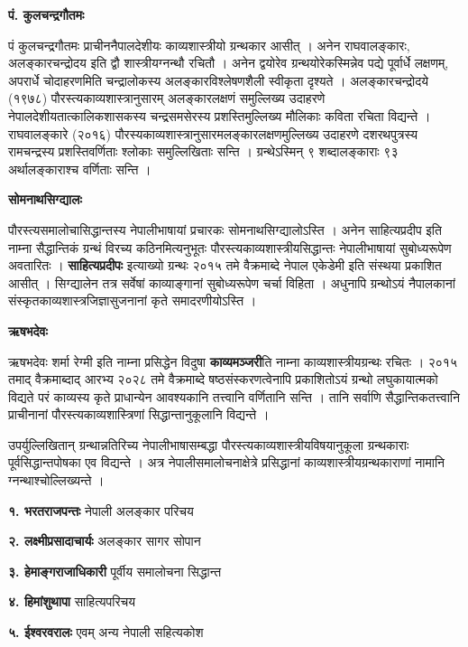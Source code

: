 \documentclass[10pt, a5paper, twoside]{article}
\newcommand{\customparagraph}[1]{
    \noindent \textbf{#1} \par
    \penalty 10000 %
    \vspace{0.1cm plus 0.05cm minus 0.02cm}
    \penalty 10000 %
}
\begin{document}
\customparagraph{\textbf{पं. कुलचन्द्रगौतमः}}

पं कुलचन्द्रगौतमः प्राचीननैपालदेशीयः काव्यशास्त्रीयो ग्रन्थकार आसीत् । अनेन राघवालङ्कारः, अलङ्कारचन्द्रोदय इति द्वौ शास्त्रीयग्नन्थौ रचितौ । अनेन द्वयोरेव ग्रन्थयोरेकस्मिन्नेव पद्ये पूर्वार्धे लक्षणम्, अपरार्धे चोदाहरणमिति चन्द्रालोकस्य अलङ्कारविश्लेषणशैली स्वीकृता दृश्यते । अलङ्कारचन्द्रोदये (१९७८) पौरस्त्यकाव्यशास्त्रानुसारम् अलङ्कारलक्षणं समुल्लिख्य उदाहरणे नेपालदेशीयतात्कालिकशासकस्य चन्द्रसमसेरस्य प्रशस्तिमुल्लिख्य मौलिकाः कविता रचिता विद्यन्ते । राघवालङ्कारे (२०१६) पौरस्यकाव्यशास्त्रानुसारमलङ्कारलक्षणमुल्लिख्य उदाहरणे दशरथपुत्रस्य रामचन्द्रस्य प्रशस्तिवर्णिताः श्लोकाः समुल्लिखिताः सन्ति । ग्रन्थेऽस्मिन् ९ शब्दालङ्काराः ९३ अर्थालङ्काराश्च वर्णिताः सन्ति ।

\customparagraph{\textbf{सोमनाथसिग्द्यालः}}

पौरस्त्यसमालोचासिद्धान्तस्य नेपालीभाषायां प्रचारकः सोमनाथसिग्द्यालोऽस्ति । अनेन साहित्यप्रदीप इति नाम्ना सैद्धान्तिकं ग्रन्थं विरच्य कठिनमित्यनुभूतः पौरस्त्यकाव्यशास्त्रीयसिद्धान्तः नेपालीभाषायां सुबोध्यरूपेण अवतारितः । \textbf{साहित्यप्रदीपः} इत्याख्यो ग्रन्थः २०१५ तमे वैक्रमाब्दे नेपाल एकेडेमी इति संस्थया प्रकाशित आसीत् । सिग्द्यालेन तत्र सर्वेषां काव्याङ्गानां सुबोध्यरूपेण चर्चा विहिता । अधुनापि ग्रन्थोऽयं नैपालकानां संस्कृतकाव्यशास्त्रजिज्ञासुजनानां कृते समादरणीयोऽस्ति ।

\customparagraph{\textbf{ऋषभदेवः}}

ऋषभदेवः शर्मा रेग्मी इति नाम्ना प्रसिद्धेन विदुषा \textbf{काव्यमञ्जरी}ति नाम्ना काव्यशास्त्रीयग्रन्थः रचितः । २०१५ तमाद् वैक्रमाब्दाद् आरभ्य २०२८ तमे वैक्रमाब्दे षष्ठसंस्करणत्वेनापि प्रकाशितोऽयं ग्रन्थो लघुकायात्मको विद्यते परं काव्यस्य कृते प्राधान्येन आवश्यकानि तत्त्वानि वर्णितानि सन्ति । तानि सर्वाणि सैद्धान्तिकतत्त्वानि प्राचीनानां पौरस्त्यकाव्यशास्त्रिणां सिद्धान्तानुकूलानि विद्यन्ते ।

उपर्युल्लिखितान् ग्रन्थान्नतिरिच्य नेपालीभाषासम्बद्धा पौरस्त्यकाव्यशास्त्रीयविषयानुकूला ग्रन्थकाराः पूर्वसिद्धान्तपोषका एव विद्यन्ते । अत्र नेपालीसमालोचनाक्षेत्रे प्रसिद्धानां काव्यशास्त्रीयग्रन्थकाराणां  नामानि ग्नन्थाश्चोल्लिख्यन्ते ।

\textbf{१. भरतराजपन्तः} नेपाली अलङ्कार परिचय

\textbf{२. लक्ष्मीप्रसादाचार्यः} अलङ्कार सागर सोपान

\textbf{३. हेमाङ्गराजाधिकारी} पूर्वीय समालोचना सिद्धान्त

\textbf{४. हिमांशुथापा} साहित्यपरिचय

\textbf{५. ईश्वरवरालः} एवम् अन्य नेपाली सहित्यकोश
\end{document}
